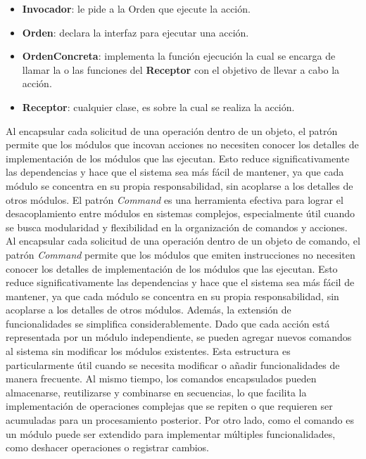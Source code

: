 \begin{itemize}
    \item \textbf{Invocador}: le pide a la Orden que ejecute la acción.
    \item \textbf{Orden}: declara la interfaz para ejecutar una acción.
    \item \textbf{OrdenConcreta}: implementa la función ejecución la cual se encarga de llamar la o las funciones del \textbf{Receptor} con el objetivo de llevar a cabo la acción.
    \item \textbf{Receptor}: cualquier clase, es sobre la cual se realiza la acción.
\end{itemize}
Al encapsular cada solicitud de una operación dentro de un objeto, el patrón permite que los módulos que incovan acciones no necesiten conocer los detalles de implementación de los módulos que las ejecutan. Esto reduce significativamente las dependencias y hace que el sistema sea más fácil de mantener, ya que cada módulo se concentra en su propia responsabilidad, sin acoplarse a los detalles de otros módulos. 
El patrón \textit{Command} es una herramienta efectiva para lograr el desacoplamiento entre módulos en sistemas complejos, especialmente útil cuando se busca modularidad y flexibilidad en la organización de comandos y acciones. Al encapsular cada solicitud de una operación dentro de un objeto de comando, el patrón \textit{Command} permite que los módulos que emiten instrucciones no necesiten conocer los detalles de implementación de los módulos que las ejecutan. Esto reduce significativamente las dependencias y hace que el sistema sea más fácil de mantener, ya que cada módulo se concentra en su propia responsabilidad, sin acoplarse a los detalles de otros módulos. Además, la extensión de funcionalidades se simplifica considerablemente. Dado que cada acción está representada por un módulo independiente, se pueden agregar nuevos comandos al sistema sin modificar los módulos existentes. Esta estructura es particularmente útil cuando se necesita modificar o añadir funcionalidades de manera frecuente. Al mismo tiempo, los comandos encapsulados pueden almacenarse, reutilizarse y combinarse en secuencias, lo que facilita la implementación de operaciones complejas que se repiten o que requieren ser acumuladas para un procesamiento posterior. Por otro lado, como el comando es un módulo puede ser extendido para implementar múltiples funcionalidades, como deshacer operaciones o registrar cambios. 

